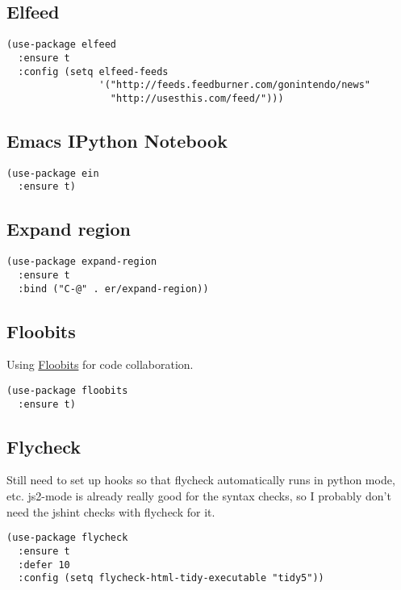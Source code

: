 \documentclass[11pt]{article}
\begin{document}
\subsection{Elfeed}
\label{sec-18-12}

\begin{verbatim}
(use-package elfeed
  :ensure t
  :config (setq elfeed-feeds
                '("http://feeds.feedburner.com/gonintendo/news"
                  "http://usesthis.com/feed/")))
\end{verbatim}

\subsection{Emacs IPython Notebook}
\label{sec-18-13}
\begin{verbatim}
(use-package ein
  :ensure t)
\end{verbatim}

\subsection{Expand region}
\label{sec-18-14}

\begin{verbatim}
(use-package expand-region
  :ensure t
  :bind ("C-@" . er/expand-region))
\end{verbatim}

\subsection{Floobits}
\label{sec-18-15}

Using \href{https://floobits.com/}{Floobits} for code collaboration.

\begin{verbatim}
(use-package floobits
  :ensure t)
\end{verbatim}

\subsection{Flycheck}
\label{sec-18-16}

Still need to set up hooks so that flycheck automatically runs in
python mode, etc. js2-mode is already really good for the syntax
checks, so I probably don't need the jshint checks with flycheck for
it.

\begin{verbatim}
(use-package flycheck
  :ensure t
  :defer 10
  :config (setq flycheck-html-tidy-executable "tidy5"))
\end{verbatim}
\end{document}
